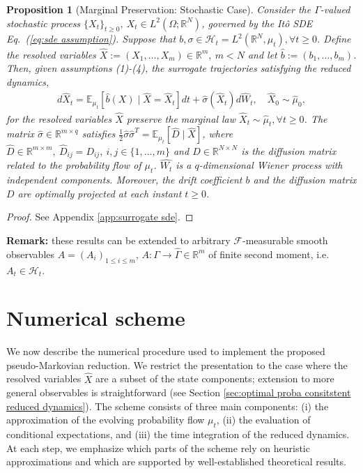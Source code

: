 \documentclass[11pt, a4paper, oneside, reqno]{amsart}
\newtheorem{proposition}[theorem]{Proposition}
\begin{document}
\begin{proposition}[Marginal Preservation: Stochastic Case]\label{prop:stochastic}
Consider the $\Gamma$-valued stochastic process $\{X_t\}_{t\geq 0}, \ X_t\in L^2(\Omega;\mathbb{R}^N)$, governed by the Itô SDE Eq.~(\ref{eq:sde assumption}). 
Suppose that $b,\sigma \in\mathcal{H}_t=L^2(\mathbb{R}^N,\mu_t),\forall t \geq 0$. Define the resolved variables $\hat{X}:=(X_1,\dots,X_m)\in\mathbb{R}^m, \ m<N$ and let $\hat{b}:=(b_1,\dots,b_m)$.
Then, given assumptions (1)-(4), the surrogate trajectories satisfying the reduced dynamics,
\begin{eqnarray}\label{eq:optimal prob consistent sde}
    d\hat{X}_t = \mathbb{E}_{\mu_t}[\hat{b}(X)\mid\hat{X}=\hat{X}_t]dt + \hat{\sigma}(\hat{X}_t)d\hat{W}_t, \quad
    \hat{X}_0 \sim \hat{\mu}_0,
\end{eqnarray}
for the resolved variables $\hat{X}$ preserve the marginal law $\hat{X}_t\sim\hat{\mu}_t, \forall t\geq 0$.
The matrix $\hat{\sigma}\in\mathbb{R}^{m \times q}$ satisfies $\frac{1}{2}\hat{\sigma}\hat{\sigma}^T = \mathbb{E}_{\mu_t}[\hat{D}\mid\hat{X}]$, where $\hat{D}\in\mathbb{R}^{m\times m}, \: \hat{D}_{ij}=D_{ij}, \: i,j\in\{1,\dots,m\}$ and $D\in\mathbb{R}^{N\times N}$ is the diffusion matrix related to the probability flow of $\mu_t$.
$\hat{W_t}$ is a $q$-dimensional Wiener process with independent components.
Moreover, the drift coefficient $b$ and the diffusion matrix $D$ are optimally projected at each instant $t\geq 0$.
\end{proposition}

\begin{proof}
See Appendix \ref{app:surrogate sde}.
\end{proof}

\noindent \textbf{Remark:} these results can be extended to arbitrary $\mathcal{F}$-measurable smooth observables $A=(A_i)_{1\leq i\leq m}$, $A:\Gamma\to\hat{\Gamma}\in\mathbb{R}^m$ of finite second moment, i.e. $A_t\in\mathcal{H}_t$.
\section{Numerical scheme}
\label{sec:numerics}
\noindent We now describe the numerical procedure used to implement the proposed pseudo-Markovian reduction. We restrict the presentation to the case where the resolved variables  $\hat{X}$ are a subset of the state components; extension to more general observables is straightforward (see Section \ref{sec:optimal proba consitstent reduced dynamics}). The scheme consists of three main components: (i) the approximation of the evolving probability flow $\mu_t$, 
(ii) the evaluation of conditional expectations, and (iii) the time integration of the reduced dynamics. 
At each step, we emphasize which parts of the scheme rely on heuristic approximations and which are supported by well-established theoretical results. 
\end{document}
